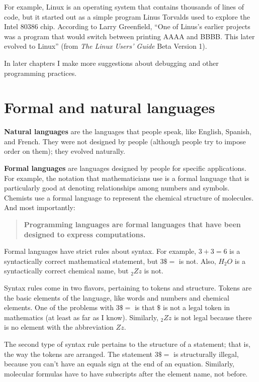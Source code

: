 \documentclass[12pt]{book}
\theoremstyle{definition}
\begin{document}
For example, Linux is an operating system that contains thousands of
lines of code, but it started out as a simple program Linus Torvalds
used to explore the Intel 80386 chip.  According to Larry Greenfield,
``One of Linus's earlier projects was a program that would switch
between printing AAAA and BBBB.  This later evolved to Linux''
(from {\em The Linux Users' Guide} Beta Version 1).


In later chapters I make more suggestions about debugging
and other programming practices.

\section{Formal and natural languages}

{\bf Natural languages} are the languages that people speak,
like English, Spanish, and French.  They were not designed
by people (although people try to impose order on them);
they evolved naturally.

{\bf Formal languages} are languages designed by people for
specific applications.  For example, the notation that mathematicians
use is a formal language that is particularly good at denoting
relationships among numbers and symbols.  Chemists use a formal
language to represent the chemical structure of molecules.  And
most importantly:

\begin{quote}
{\bf Programming languages are formal languages that have been
designed to express computations.}
\end{quote}

Formal languages have strict rules
about syntax.  For example, $3+3=6$ is a syntactically correct
mathematical statement, but $3 \$ =$ is not.  Also, $H_2O$ is a
syntactically correct chemical name, but $_2Zz$ is not.

Syntax rules come in two flavors, pertaining to tokens and structure.
Tokens are the basic elements of the language, like words and numbers
and chemical elements.  One of the problems with $3 \$ =$ is that
$\$$ is not a legal token in mathematics (at least as far as I
know).  Similarly, $_2Zz$ is not legal because there is no element with
the abbreviation $Zz$.

The second type of syntax rule pertains to the structure of a
statement; that is, the way the tokens are arranged.  The statement
$3 \$ =$ is structurally illegal, because you can't have an equals
sign at the end of an equation.  Similarly, molecular formulas
have to have subscripts after the element name, not before.
\end{document}

